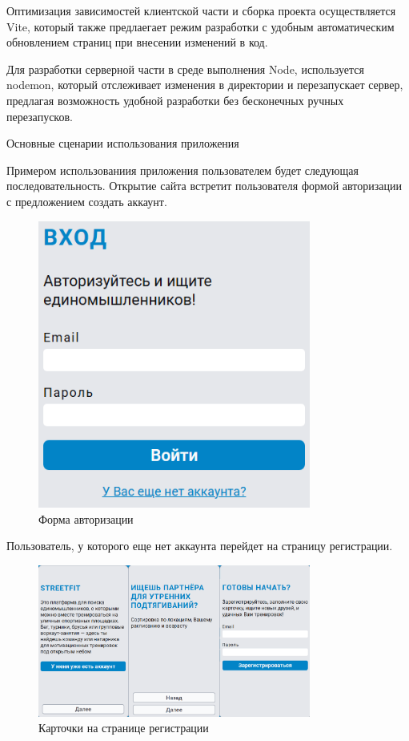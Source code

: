 \documentclass[14pt]{article}
\begin{document}
Оптимизация зависимостей клиентской части и сборка проекта осуществляется Vite,
который также предлаегает режим разработки с удобным автоматическим обновлением страниц при внесении изменений в код.

Для разработки серверной части в среде выполнения Node,
используется nodemon, который отслеживает изменения в директории и перезапускает
сервер, предлагая возможность удобной разработки без бесконечных ручных перезапусков.

Основные сценарии использования приложения

Примером использованиия приложения пользователем будет следующая последовательность.
Открытие сайта встретит пользователя формой авторизации с предложением создать аккаунт.

\begin{figure}[H!]
	\centering
	\includegraphics[width=0.8\textwidth]{fig8.png}
	\caption{Форма авторизации}
\end{figure}

Пользователь, у которого еще нет аккаунта перейдет на страницу регистрации.

\begin{figure}[H!]
	\centering
	\includegraphics[width=0.8\textwidth]{fig9.png}
	\caption{Карточки на странице регистрации}
\end{figure}
\end{document}
